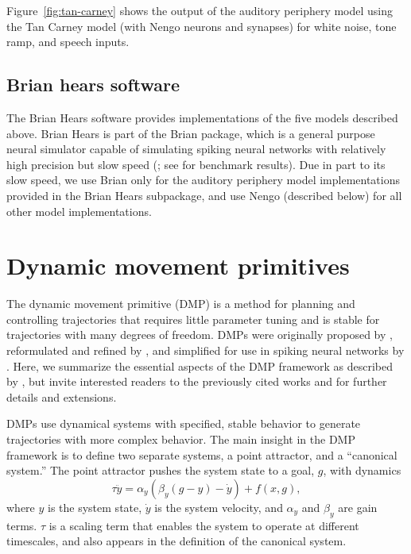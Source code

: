 Figure~\ref{fig:tan-carney} shows the output
of the auditory periphery model
using the Tan Carney model
(with Nengo neurons and synapses)
for white noise, tone ramp, and speech inputs.


\subsection{Brian hears software}
\label{sec:brian-hears}

The Brian Hears software
\citep{fontaine2011}
provides implementations
of the five models described above.
Brian Hears is part of the
Brian package,
which is a general purpose
neural simulator capable
of simulating spiking neural networks
with relatively high precision
but slow speed
(\citealp{goodman2008};
see \citealt{bekolay2013} for benchmark results).
Due in part to its slow speed,
we use Brian only for
the auditory periphery model implementations
provided in the Brian Hears subpackage,
and use Nengo (described below)
for all other model implementations.

\section{Dynamic movement primitives}
\label{sec:methods-dmp}

The dynamic movement primitive (DMP)
is a method for planning and controlling trajectories
that requires little parameter tuning
and is stable for trajectories
with many degrees of freedom.
DMPs were originally proposed
by \citet{schaal2005,schaal2006},
reformulated and refined by \citet{ijspeert2007},
and simplified for use in spiking neural networks
by \citet{dewolf2015}.
Here, we summarize the essential aspects
of the DMP framework as described by \citet{dewolf2015},
but invite interested readers to
the previously cited works
and \citet{vijayakumar2005,ijspeert2013}
for further details and extensions.

DMPs use dynamical systems
with specified, stable behavior
to generate trajectories
with more complex behavior.
The main insight in the DMP framework
is to define two separate systems,
a point attractor,
and a ``canonical system.''
The point attractor pushes
the system state to
a goal, $g$, with dynamics
\begin{equation} \label{dmp-pointattractor}
  \tau\ddot{y} = \alpha_y(\beta_y(g - y) - \dot{y}) + f(x, g),
\end{equation}
where $y$ is the system state,
$\dot{y}$ is the system velocity,
and $\alpha_y$ and $\beta_y$ are gain terms.
$\tau$ is a scaling term
that enables the system to operate
at different timescales,
and also appears in the definition
of the canonical system.

